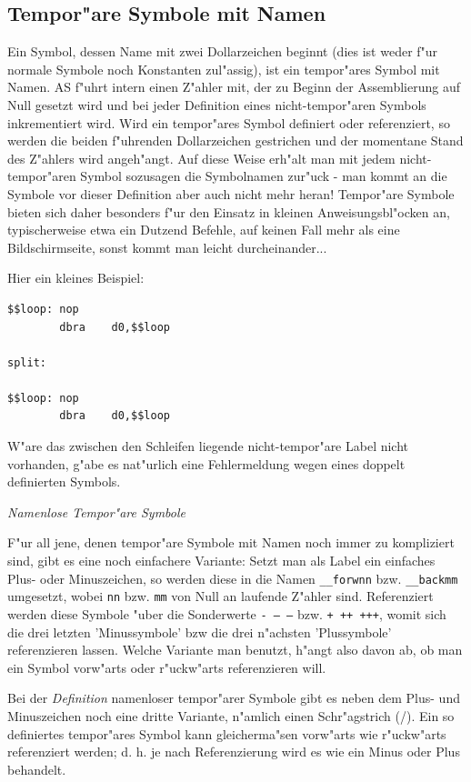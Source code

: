 \documentclass[12pt,a4paper,twoside]{report}
\newcommand{\asname}{AS}
\begin{document}
\subsection{Tempor"are Symbole mit Namen}

Ein Symbol, dessen Name mit zwei Dollarzeichen beginnt (dies ist weder
f"ur normale Symbole noch Konstanten zul"assig), ist ein tempor"ares
Symbol mit Namen.  \asname{} f"uhrt intern einen Z"ahler mit, der zu Beginn der
Assemblierung auf Null gesetzt wird und bei jeder Definition eines
nicht-tempor"aren Symbols inkrementiert wird.  Wird ein tempor"ares Symbol
definiert oder referenziert, so werden die beiden f"uhrenden Dollarzeichen
gestrichen und der momentane Stand des Z"ahlers wird angeh"angt.  Auf
diese Weise erh"alt man mit jedem nicht-tempor"aren Symbol sozusagen die
Symbolnamen zur"uck - man kommt an die Symbole vor dieser Definition aber
auch nicht mehr heran!  Tempor"are Symbole bieten sich daher besonders
f"ur den Einsatz in kleinen Anweisungsbl"ocken an, typischerweise etwa ein
Dutzend Befehle, auf keinen Fall mehr als eine Bildschirmseite, sonst
kommt man leicht durcheinander...

Hier ein kleines Beispiel:
\begin{verbatim}
$$loop: nop
        dbra    d0,$$loop

split:

$$loop: nop
        dbra    d0,$$loop
\end{verbatim}
W"are das zwischen den Schleifen liegende nicht-tempor"are Label nicht
vorhanden, g"abe es nat"urlich eine Fehlermeldung wegen eines doppelt
definierten Symbols.

{\em Namenlose Tempor"are Symbole}

F"ur all jene, denen tempor"are Symbole mit Namen noch immer zu
kompliziert sind, gibt es eine noch einfachere Variante: Setzt man als
Label ein einfaches Plus- oder Minuszeichen, so werden diese in die Namen
{\tt \_\_forwnn} bzw. {\tt \_\_backmm} umgesetzt, wobei {\tt nn} bzw. {\tt mm}
von Null an laufende Z"ahler sind.  Referenziert werden diese Symbole
"uber die Sonderwerte {\tt - -- ---} bzw. {\tt + ++ +++}, womit sich die
drei letzten 'Minussymbole' bzw die drei n"achsten 'Plussymbole'
referenzieren lassen.  Welche Variante man benutzt, h"angt also davon ab,
ob man ein Symbol vorw"arts oder r"uckw"arts referenzieren will.

Bei der {\em Definition} namenloser tempor"arer Symbole gibt es neben dem
Plus- und Minuszeichen noch eine dritte Variante, n"amlich einen
Schr"agstrich (/).  Ein so definiertes tempor"ares Symbol kann
gleicherma"sen vorw"arts wie r"uckw"arts referenziert werden; d. h. je
nach Referenzierung wird es wie ein Minus oder Plus behandelt.
\end{document}
